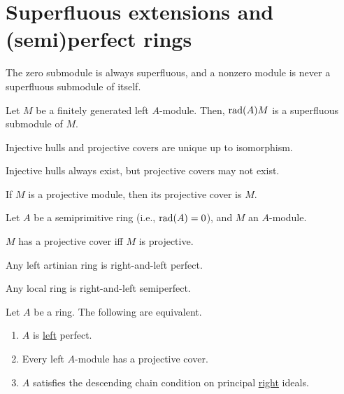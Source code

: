 \documentclass[12pt]{article}
\begin{document}
\section{Superfluous extensions and (semi)perfect rings}

\begin{thm}
	The zero submodule is always superfluous, and a nonzero module is never a superfluous submodule of itself. 
\end{thm}

\begin{thm}
	Let $M$ be a finitely generated left $A$-module. 
	Then, $\operatorname{rad}(A)M$ is a superfluous submodule of $M$.
\end{thm}

\begin{thm}
	Injective hulls and projective covers are unique up to isomorphism.

	Injective hulls always exist, but projective covers may not exist.
\end{thm}

\begin{thm}
	If $M$ is a projective module, then its projective cover is $M$.
\end{thm}

\begin{thm}
	Let $A$ be a semiprimitive ring (i.e., $\operatorname{rad}(A) = 0$), and $M$ an $A$-module. 

	$M$ has a projective cover iff $M$ is projective.
\end{thm}

\begin{thm}
	Any left artinian ring is right-and-left perfect. 

	Any local ring is right-and-left semiperfect.
\end{thm}

\begin{thm}
	Let $A$ be a ring. The following are equivalent.
	\begin{enumerate}[label=(\alph*)]
		\item $A$ is \underline{left} perfect.
		\item Every left $A$-module has a projective cover. 
		\item $A$ satisfies the descending chain condition on principal \underline{right} ideals.
	\end{enumerate}
\end{thm}
\end{document}
